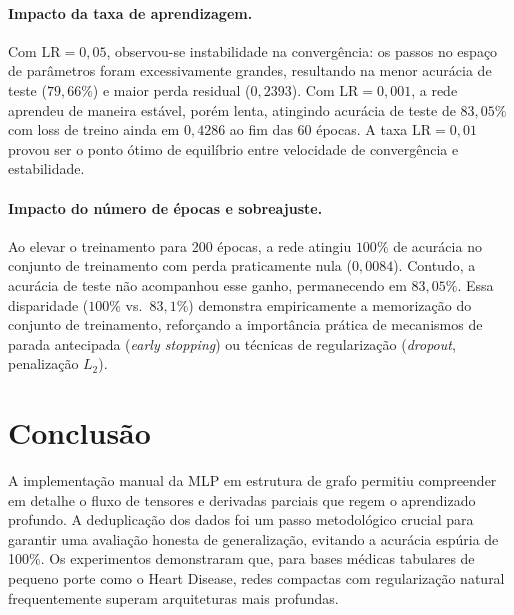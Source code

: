 \documentclass[runningheads]{llncs}
\begin{document}
\paragraph{Impacto da taxa de aprendizagem.}
Com $\text{LR}=0{,}05$, observou-se instabilidade na convergência: os passos
no espaço de parâmetros foram excessivamente grandes, resultando na menor
acurácia de teste ($79{,}66\%$) e maior perda residual ($0{,}2393$).
Com $\text{LR}=0{,}001$, a rede aprendeu de maneira estável, porém lenta,
atingindo acurácia de teste de $83{,}05\%$ com loss de treino ainda em
$0{,}4286$ ao fim das 60 épocas. A taxa $\text{LR}=0{,}01$ provou ser
o ponto ótimo de equilíbrio entre velocidade de convergência e estabilidade.

\paragraph{Impacto do número de épocas e sobreajuste.}
Ao elevar o treinamento para 200 épocas, a rede atingiu $100\%$ de acurácia no
conjunto de treinamento com perda praticamente nula ($0{,}0084$). Contudo,
a acurácia de teste não acompanhou esse ganho, permanecendo em $83{,}05\%$.
Essa disparidade ($100\%$ vs.\ $83{,}1\%$) demonstra empiricamente a
memorização do conjunto de treinamento, reforçando a importância prática de
mecanismos de parada antecipada (\textit{early stopping}) ou técnicas de
regularização (\textit{dropout}, penalização $L_2$).

\section{Conclusão}

A implementação manual da MLP em estrutura de grafo permitiu compreender
em detalhe o fluxo de tensores e derivadas parciais que regem o aprendizado
profundo. A deduplicação dos dados foi um passo metodológico crucial para
garantir uma avaliação honesta de generalização, evitando a acurácia espúria
de 100\%. Os experimentos demonstraram que, para bases médicas tabulares de
pequeno porte como o Heart Disease, redes compactas com regularização natural
frequentemente superam arquiteturas mais profundas.

\end{document}
